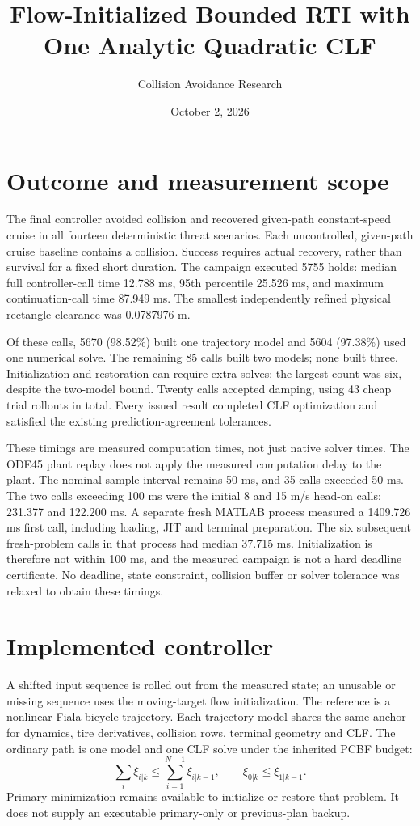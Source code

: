 \documentclass[10pt]{article}
\title{Flow-Initialized Bounded RTI with One Analytic Quadratic CLF}
\author{Collision Avoidance Research}
\date{October 2, 2026}
\begin{document}
\maketitle

\section{Outcome and measurement scope}
The final controller avoided collision and recovered given-path constant-speed
cruise in all fourteen deterministic threat scenarios. Each uncontrolled,
given-path cruise baseline contains a collision. Success requires actual
recovery, rather than survival for a fixed short duration. The campaign executed
5755 holds: median full controller-call time 12.788 ms, 95th percentile 25.526 ms,
and maximum continuation-call time 87.949 ms. The smallest independently refined
physical rectangle clearance was 0.0787976 m.

Of these calls, 5670 (98.52\%) built one trajectory model and 5604 (97.38\%) used
one numerical solve. The remaining 85 calls built two models; none built three.
Initialization and restoration can require extra solves: the largest count was
six, despite the two-model bound. Twenty calls accepted damping, using 43 cheap
trial rollouts in total. Every issued result completed CLF optimization and
satisfied the existing prediction-agreement tolerances.

These timings are measured computation times, not just native solver times.
The ODE45 plant replay does not apply the measured computation delay to the
plant. The nominal sample interval remains 50 ms, and 35 calls exceeded 50 ms.
The two calls exceeding 100 ms were the initial 8 and 15 m/s head-on calls:
231.377 and 122.200 ms. A separate fresh MATLAB process measured a 1409.726 ms
first call, including loading, JIT and terminal preparation. The six subsequent
fresh-problem calls in that process had median 37.715 ms. Initialization is
therefore not within 100 ms, and the measured campaign is not a hard deadline
certificate. No deadline, state constraint, collision buffer or solver tolerance
was relaxed to obtain these timings.

\section{Implemented controller}
A shifted input sequence is rolled out from the measured state; an unusable or
missing sequence uses the moving-target flow initialization. The reference is a
nonlinear Fiala bicycle trajectory. Each trajectory model shares the same anchor
for dynamics, tire derivatives, collision rows, terminal geometry and CLF.
The ordinary path is one model and one CLF solve under the inherited PCBF budget:
\[
 \sum_i \xi_{i|k}\leq\sum_{i=1}^{N-1}\xi_{i|k-1},\qquad
 \xi_{0|k}\leq\xi_{1|k-1}.
\]
Primary minimization remains available to initialize or restore that problem.
It does not supply an executable primary-only or previous-plan backup.
\end{document}
